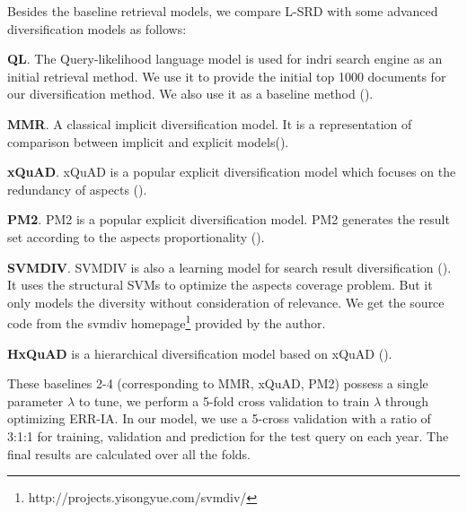 \documentclass[review]{elsarticle}
\newcommand\revised[1]{{\color{black} #1}}
\begin{document}
Besides the baseline retrieval models, we compare L-SRD with some advanced diversification models as follows:
\begin{itemize}
    \item \textbf{QL}. The Query-likelihood language model is used for indri search engine as an initial retrieval method. We use it to provide the initial top 1000 documents for our diversification method. We also use it as a baseline method (\cite{dang2012diversity}).
    
	\item \textbf{MMR}. A classical implicit diversification model. It is a representation of comparison between implicit and explicit models(\cite{carbonell1998use}).
	
	\item \textbf{xQuAD}. xQuAD is a popular explicit diversification model which focuses on the redundancy of aspects (\cite{santos2010exploiting}).
	
	\item \textbf{PM2}. PM2 is a popular explicit diversification model. PM2 generates the result set according to the aspects proportionality (\cite{dang2012diversity}).
	
    \item \textbf{SVMDIV}. SVMDIV is also a learning model for search result diversification (\cite{yue2008predicting}). It uses the structural SVMs to optimize the aspects coverage problem. But it only models the diversity without consideration of relevance. We get the source code from the svmdiv homepage\footnote{http://projects.yisongyue.com/svmdiv/} provided by the author.
    
    \revised{
    	\item \textbf{HxQuAD} is a hierarchical diversification model based on xQuAD (\cite{Hu15searchresult}).
    	}
    
\end{itemize}


\revised{
These baselines 2-4 (corresponding to MMR, xQuAD, PM2) possess a single parameter $\lambda$ to tune, we perform a 5-fold cross validation to train $\lambda$ through optimizing ERR-IA. In our model, we use a 5-cross validation with a ratio of 3:1:1 for training, validation and prediction for the test query on each year. The final results are calculated over all the folds.}

\end{document}
